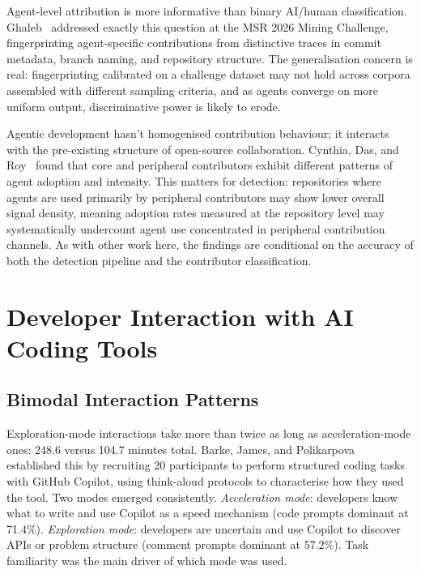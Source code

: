 Agent-level attribution is more informative than binary AI/human classification. Ghaleb~\cite{ghaleb2026} addressed exactly this question at the MSR 2026 Mining Challenge, fingerprinting agent-specific contributions from distinctive traces in commit metadata, branch naming, and repository structure. The generalisation concern is real: fingerprinting calibrated on a challenge dataset may not hold across corpora assembled with different sampling criteria, and as agents converge on more uniform output, discriminative power is likely to erode.

Agentic development hasn't homogenised contribution behaviour; it interacts with the pre-existing structure of open-source collaboration. Cynthia, Das, and Roy~\cite{cynthia2026} found that core and peripheral contributors exhibit different patterns of agent adoption and intensity. This matters for detection: repositories where agents are used primarily by peripheral contributors may show lower overall signal density, meaning adoption rates measured at the repository level may systematically undercount agent use concentrated in peripheral contribution channels. As with other work here, the findings are conditional on the accuracy of both the detection pipeline and the contributor classification.

\section{Developer Interaction with AI Coding Tools}
\label{sec:lr:interaction}

\subsection{Bimodal Interaction Patterns}

Exploration-mode interactions take more than twice as long as acceleration-mode ones: 248.6 versus 104.7 minutes total. Barke, James, and Polikarpova~\cite{barke2023} established this by recruiting 20 participants to perform structured coding tasks with GitHub Copilot, using think-aloud protocols to characterise how they used the tool. Two modes emerged consistently. \emph{Acceleration mode}: developers know what to write and use Copilot as a speed mechanism (code prompts dominant at 71.4\%). \emph{Exploration mode}: developers are uncertain and use Copilot to discover APIs or problem structure (comment prompts dominant at 57.2\%). Task familiarity was the main driver of which mode was used.

